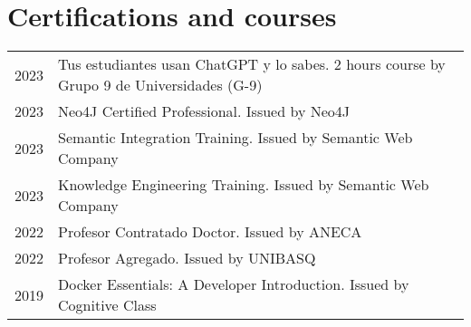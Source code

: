 \documentclass[11pt,fullpage]{article}
\begin{document}
\section*{Certifications and courses}

\begin{longtable}{p{0.5in}|p{5.5in}}
  2023 & Tus estudiantes usan ChatGPT y lo sabes. 2 hours course by Grupo 9 de Universidades (G-9) \\
  2023 & Neo4J Certified Professional. Issued by Neo4J \\ %
  2023 & Semantic Integration Training. Issued by Semantic Web Company \\ %
  2023 & Knowledge Engineering Training. Issued by Semantic Web Company \\ %
  2022 & Profesor Contratado Doctor. Issued by ANECA \\
  2022 & Profesor Agregado. Issued by UNIBASQ \\
  2019 & Docker Essentials: A Developer Introduction. Issued by Cognitive Class \\ %

\end{longtable}
\end{document}
